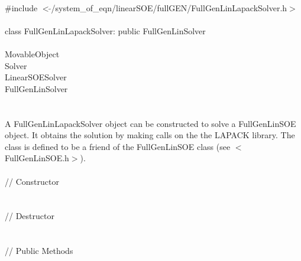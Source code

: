 
   \\
\indent \#include $<\tilde{ }$/system\_of\_eqn/linearSOE/fullGEN/FullGenLinLapackSolver.h$>$  \\

  \\
\indent class FullGenLinLapackSolver: public FullGenLinSolver  \\

 \\
\indent  MovableObject \\
\indent\indent  Solver \\
\indent\indent\indent LinearSOESolver \\
\indent\indent\indent\indent  FullGenLinSolver \\
\indent\indent\indent\indent{} \\

  \\
\indent A FullGenLinLapackSolver object can be constructed to solve
a FullGenLinSOE object. It obtains the solution by making calls on the
the LAPACK library. The class is defined to be a friend of the 
FullGenLinSOE class (see $<$FullGenLinSOE.h$>$). \\

  \\
\indent\indent // Constructor \\
\indent{}  \\ \\
\indent\indent // Destructor \\
\indent{}\\  \\
\indent\indent // Public Methods \\
\indent{} \\
\indent{} \\
\indent{} \\ 
\indent{} \\ 


